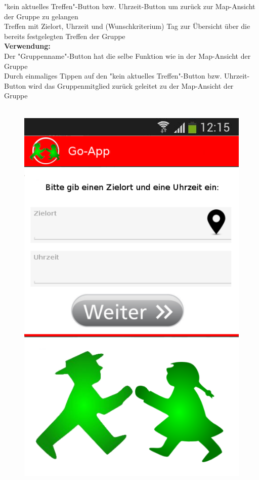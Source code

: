 "kein aktuelles Treffen"-Button bzw. Uhrzeit-Button um zurück zur Map-Ansicht der Gruppe zu gelangen\\
Treffen mit Zielort, Uhrzeit und (Wunschkriterium) Tag zur Übersicht über die bereits festgelegten Treffen der Gruppe\\
\textbf{Verwendung:}\\
Der "Gruppenname"-Button  hat die selbe Funktion wie in der Map-Ansicht der Gruppe\\
Durch einmaliges Tippen auf den "kein aktuelles Treffen"-Button bzw. Uhrzeit-Button wird das Gruppenmitglied zurück geleitet zu der Map-Ansicht der Gruppe\\ \\

\begin{figure} 
	\includegraphics[scale =1]{resources/images/treffpunkt_erstellen.png}
\end{figure}
